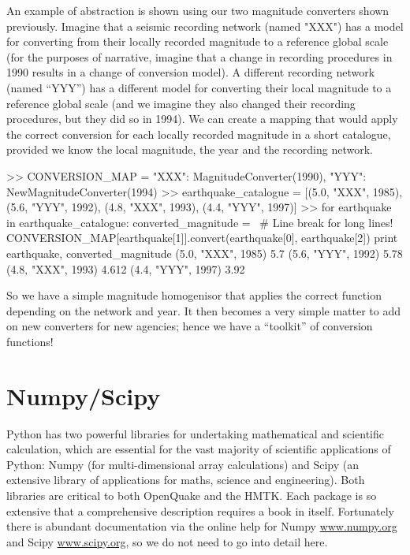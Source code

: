 An example of abstraction is shown using our two magnitude converters shown previously. Imagine that a seismic recording network (named "XXX") has a model for converting from their locally recorded magnitude to a reference global scale (for the purposes of narrative, imagine that a change in recording procedures in 1990 results in a change of conversion model). A different recording network (named ``YYY'') has a different model for converting their local magnitude to a reference global scale (and we imagine they also changed their recording procedures, but they did so in 1994). We can create a mapping that would apply the correct conversion for each locally recorded magnitude in a short catalogue, provided we know the local magnitude, the year and the recording network.

\begin{python}[frame=single]
>> CONVERSION_MAP = {"XXX": MagnitudeConverter(1990),
                     "YYY": NewMagnitudeConverter(1994)}
>> earthquake_catalogue = [(5.0, "XXX", 1985),
                           (5.6, "YYY", 1992),
                           (4.8, "XXX", 1993),
                           (4.4, "YYY", 1997)]
>> for earthquake in earthquake_catalogue:
       converted_magnitude = \ # Line break for long lines!
           CONVERSION_MAP[earthquake[1]].convert(earthquake[0],
                                                 earthquake[2])
       print earthquake, converted_magnitude
(5.0, "XXX", 1985) 5.7
(5.6, "YYY", 1992) 5.78
(4.8, "XXX", 1993) 4.612
(4.4, "YYY", 1997) 3.92
\end{python}

So we have a simple magnitude homogenisor that applies the correct function depending on the network and year. It then becomes a very simple matter to add on new converters for new agencies; hence we have a ``toolkit'' of conversion functions!

\section{Numpy/Scipy}

Python has two powerful libraries for undertaking mathematical and scientific calculation, which are essential for the vast majority of scientific applications of Python: Numpy (for multi-dimensional array calculations) and Scipy (an extensive library of applications for maths, science and engineering). Both libraries are critical to both OpenQuake and the HMTK. Each package is so extensive that a comprehensive description requires a book in itself. Fortunately there is abundant documentation via the online help for Numpy \href{www.numpy.org}{www.numpy.org} and Scipy \href{www.scipy.org}{www.scipy.org}, so we do not need to go into detail here. 

